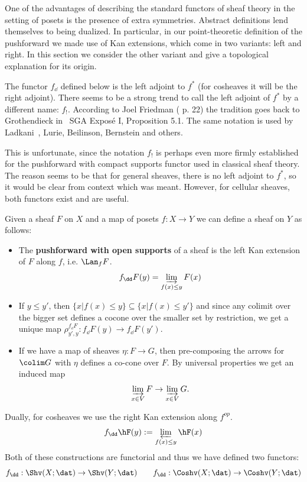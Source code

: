 One of the advantages of describing the standard functors of sheaf theory in the setting of posets is the presence of extra symmetries. Abstract definitions lend themselves to being dualized. In particular, in our point-theoretic definition of the pushforward we made use of Kan extensions, which come in two variants: left and right. In this section we consider the other variant and give a topological explanation for its origin.

\begin{rmk}[Caveat]
	The functor $f_{\dd}$ defined below is the left adjoint to $f^*$ (for cosheaves it will be the right adjoint). There seems to be a strong trend to call the left adjoint of $f^*$ by a different name: $f_!$. According to Joel Friedman (\cite{friedman} p. 22) the tradition goes back to Grothendieck in~\cite{sga4.1} SGA Expos\'e I, Proposition 5.1. The same notation is used by Ladkani~\cite{sl-dereq}, Lurie, Beilinson, Bernstein and others.

	This is unfortunate, since the notation $f_!$ is perhaps even more firmly established for the pushforward with compact supports functor used in classical sheaf theory. The reason seems to be that for general sheaves, there is no left adjoint to $f^*$, so it would be clear from context which was meant. However, for cellular sheaves, both functors exist and are useful.
\end{rmk}

\begin{defn}
 Given a sheaf $F$ on $X$ and a map of posets $f:X\to Y$ we can define a sheaf on $Y$ as follows:
\begin{itemize}
 \item The \textbf{pushforward with open supports} of a sheaf is the left Kan extension of $F$ along $f$, i.e. $\Lan_f F$. \[f_{\dd}F(y)=\varinjlim_{f(x)\leq y} F(x)\]
 \item If $y\leq y'$, then $\{x|f(x)\leq y\}\subseteq\{x|f(x)\leq y'\}$ and since any colimit over the bigger set defines a cocone over the smaller set by restriction, we get a unique map $\rho^{f_{\dd}F}_{y',y}:f_{\dd}F(y)\to f_{\dd}F(y')$.
 \item If we have a map of sheaves $\eta:F\to G$, then pre-composing the arrows for $\colim G$ with $\eta$ defines a co-cone over $F$. By universal properties we get an induced map \[\varinjlim_{x\in V} F\to \varinjlim_{x\in V} G.\]
\end{itemize}

Dually, for cosheaves we use the right Kan extension along $f^{op}$.
\[f_{\dd}\hF(y):= \varprojlim_{f(x)\leq y}\hF(x)\]
Both of these constructions are functorial and thus we have defined two functors:
\[
f_{\dd}:\Shv(X;\dat) \to \Shv(Y;\dat) \qquad f_{\dd}:\Coshv(X;\dat)\to\Coshv(Y;\dat)
\]
\end{defn}

